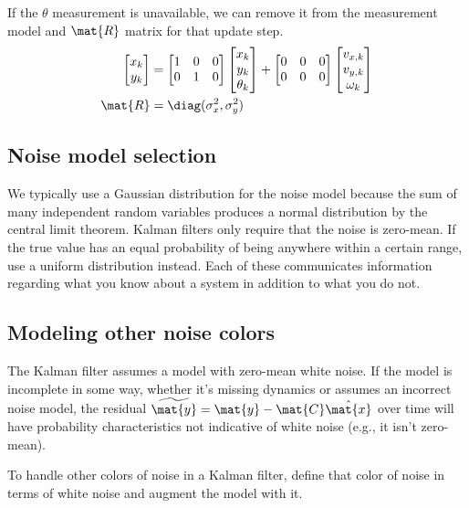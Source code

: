 If the $\theta$ measurement is unavailable, we can remove it from the
measurement model and $\mat{R}$ matrix for that update step.
\begin{align*}
  \begin{bmatrix}
    x_k \\
    y_k
  \end{bmatrix} &=
  \begin{bmatrix}
    1 & 0 & 0 \\
    0 & 1 & 0
  \end{bmatrix}
  \begin{bmatrix}
    x_k \\
    y_k \\
    \theta_k
  \end{bmatrix} +
  \begin{bmatrix}
    0 & 0 & 0 \\
    0 & 0 & 0
  \end{bmatrix}
  \begin{bmatrix}
    v_{x,k} \\
    v_{y,k} \\
    \omega_k
  \end{bmatrix} \\
  \mat{R} &= \diag(\sigma_x^2, \sigma_y^2)
\end{align*}

\subsection{Noise model selection}

We typically use a Gaussian distribution for the noise \gls{model} because the
sum of many independent random variables produces a normal distribution by the
central limit theorem. Kalman filters only require that the noise is zero-mean.
If the true value has an equal probability of being anywhere within a certain
range, use a uniform distribution instead. Each of these communicates
information regarding what you know about a system in addition to what you do
not.

\subsection{Modeling other noise colors}

The Kalman filter assumes a \gls{model} with zero-mean white noise. If the
\gls{model} is incomplete in some way, whether it's missing dynamics or assumes
an incorrect noise \gls{model}, the residual
$\widetilde{\mat{y}} = \mat{y} - \mat{C}\hat{\mat{x}}$ over time will have
probability characteristics not indicative of white noise (e.g., it isn't
zero-mean).

To handle other colors of noise in a Kalman filter, define that color of noise
in terms of white noise and augment the \gls{model} with it.
